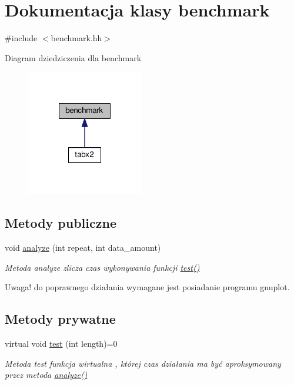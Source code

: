 \hypertarget{classbenchmark}{\section{Dokumentacja klasy benchmark}
\label{classbenchmark}
}


{\ttfamily \#include $<$benchmark.\-hh$>$}



Diagram dziedziczenia dla benchmark\nopagebreak
\begin{figure}[H]
\begin{center}
\leavevmode
\includegraphics[width=144pt]{classbenchmark__inherit__graph}
\end{center}
\end{figure}
\subsection*{Metody publiczne}
\begin{DoxyCompactItemize}
\item 
void \hyperlink{classbenchmark_a23e508cd746c10ba8a650965673aa839}{analyze} (int repeat, int data\-\_\-amount)
\begin{DoxyCompactList}\small\item\em Metoda analyze zlicza czas wykonywania funkcji \hyperlink{classbenchmark_a698d333f815e6e12c0817b1dfee56e99}{test()} \par
 Uwaga! do poprawnego działania wymagane jest posiadanie programu gnuplot. \end{DoxyCompactList}\end{DoxyCompactItemize}
\subsection*{Metody prywatne}
\begin{DoxyCompactItemize}
\item 
virtual void \hyperlink{classbenchmark_a698d333f815e6e12c0817b1dfee56e99}{test} (int length)=0
\begin{DoxyCompactList}\small\item\em Metoda test funkcja wirtualna , której czas działania ma być aproksymowany przez metoda \hyperlink{classbenchmark_a23e508cd746c10ba8a650965673aa839}{analyze()} \end{DoxyCompactList}\end{DoxyCompactItemize}


